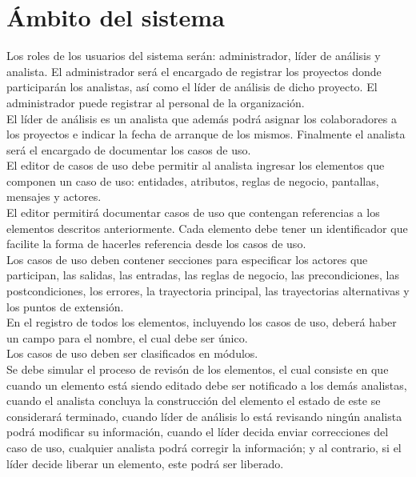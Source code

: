 \section{Ámbito del sistema}
Los roles de los usuarios del sistema serán: administrador, líder de análisis y analista. El administrador será el encargado 
de registrar los proyectos donde participarán los analistas, así como el líder de análisis de dicho proyecto. El administrador puede
registrar al personal de la organización.\\

El líder de análisis es un analista que además podrá asignar los colaboradores a los proyectos e indicar la fecha de arranque de los mismos. Finalmente
el analista será el encargado de documentar los casos de uso.\\

El editor de casos de uso debe permitir al analista ingresar los elementos que componen un caso de uso: entidades, atributos, 
reglas de negocio, pantallas, mensajes y actores.\\

El editor permitirá documentar casos de uso que contengan referencias a los elementos descritos anteriormente.
Cada elemento debe tener un identificador que facilite la forma de hacerles referencia desde los casos de uso.\\

Los casos de uso deben contener secciones para especificar los actores que participan, las salidas, las entradas, las reglas de negocio,
las precondiciones, las postcondiciones, los errores, la trayectoria principal, las trayectorias alternativas y los puntos de extensión.\\

En el registro de todos los elementos, incluyendo los casos de uso, deberá haber un campo para el nombre, el cual debe ser único.\\

Los casos de uso deben ser clasificados en módulos.\\

Se debe simular el proceso de revisón de los elementos, el cual consiste en que cuando un elemento está siendo editado debe ser notificado a los demás analistas, cuando 
el analista concluya la construcción del elemento el estado de este se considerará terminado, cuando líder de análisis lo está revisando ningún analista
podrá modificar su información, cuando el líder decida enviar correcciones del caso de uso, cualquier analista podrá corregir la información; y al contrario, 
si el líder decide liberar un elemento, este podrá ser liberado.\\

